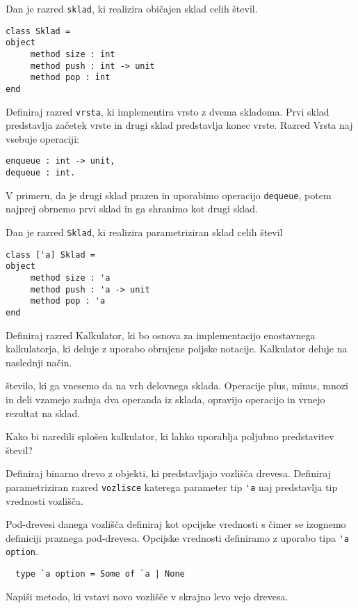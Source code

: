 \begin{ex}
Dan je razred \lstinline{sklad}, ki realizira obi\v cajen sklad celih \v stevil.
\begin{lstlisting}
class Sklad =
object 
     method size : int
     method push : int -> unit
     method pop : int
end
\end{lstlisting}

Definiraj razred \lstinline{vrsta}, ki implementira vrsto z dvema skladoma. Prvi sklad predstavlja za\v cetek vrste in drugi sklad predstavlja konec vrste. Razred Vrsta naj vsebuje operaciji: 
\begin{lstlisting}
enqueue : int -> unit, 
dequeue : int. 
\end{lstlisting}
V primeru, da je drugi sklad prazen in uporabimo operacijo \texttt{dequeue}, potem najprej obrnemo prvi sklad in ga shranimo kot drugi sklad.
\end{ex}






\begin{ex}
Dan je razred \texttt{Sklad}, ki realizira parametriziran sklad celih \v stevil
\begin{lstlisting}
class ['a] Sklad =
object 
     method size : 'a
     method push : 'a -> unit
     method pop : 'a
end
\end{lstlisting}
Definiraj razred Kalkulator, ki bo osnova za implementacijo enostavnega kalkulatorja, ki deluje z uporabo obrnjene poljske notacije. Kalkulator deluje na naslednji na\v cin.  

\v stevilo, ki ga vnesemo da na vrh delovnega sklada. Operacije plus, minus, mnozi in deli vzamejo zadnja dva operanda iz sklada, opravijo operacijo in vrnejo rezultat na sklad. 

Kako bi naredili splo\v sen kalkulator, ki lahko uporablja poljubno predstavitev \v stevil?


\end{ex} 



\begin{ex}
  Definiraj binarno drevo z objekti, ki predstavljajo vozli\v s\v
  ca drevesa. Definiraj parametriziran razred \lstinline{vozlisce}
  katerega parameter tip \lstinline{'a} naj predstavlja tip vrednosti
  vozli\v s\v ca.

  Pod-drevesi danega vozli\v s\v ca definiraj kot opcijske vrednosti s
  \v cimer se izognemo definiciji praznega pod-drevesa. Opcijske
  vrednosti definiramo z uporabo tipa \lstinline{'a option}.

  \begin{lstlisting}
  type `a option = Some of `a | None
  \end{lstlisting}

  Napi\v si metodo, ki vstavi novo vozli\v s\v ce v skrajno levo vejo
  drevesa.
\end{ex} 



